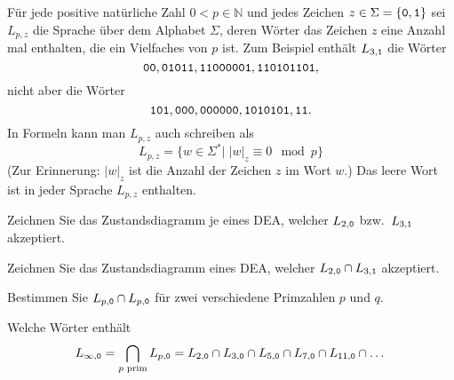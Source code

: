 Für jede positive natürliche Zahl $0<p\in\mathbb N$ und jedes Zeichen
$z\in \Sigma=\{\text{\tt 0},\text{\tt 1}\}$
sei $L_{p,z}$ die Sprache über dem Alphabet
$\Sigma$, deren Wörter das Zeichen $z$ eine Anzahl mal
enthalten, die ein Vielfaches von $p$ ist. Zum Beispiel enthält
$L_{3,\text{\tt 1}}$ die Wörter
\[
\text{\tt 00},
\text{\tt 01011},
\text{\tt 11000001},
\text{\tt 110101101},
\]
nicht aber die Wörter
\[
\text{\tt 101},
\text{\tt 000},
\text{\tt 000000},
\text{\tt 1010101},
\text{\tt 11}.
\]
In Formeln kann man $L_{p,z}$ auch schreiben als
\[
L_{p,z}=\{w\in\Sigma^*|\; |w|_z\equiv 0\mod p\}
\]
(Zur Erinnerung: $|w|_z$ ist die Anzahl der Zeichen $z$ im Wort $w$.)
Das leere Wort ist in jeder Sprache $L_{p,z}$ enthalten.
\begin{teilaufgaben}
\item Zeichnen Sie das Zustandsdiagramm je eines DEA, welcher
$L_{2,\text{\tt 0}}$ bzw.~$L_{3,\text{\tt 1}}$ akzeptiert.
\item Zeichnen Sie das Zustandsdiagramm eines DEA, welcher
$L_{2,\text{\tt 0}}\cap L_{3,\text{\tt 1}}$ akzeptiert.
\item
Bestimmen Sie
$L_{p,\text{\tt 0}} \cap L_{p,\text{\tt 0}}$
für zwei verschiedene Primzahlen $p$ und $q$.
\item Welche Wörter enthält
\[
L_{\infty,\text{\tt 0}}
=
\bigcap_{\text{$p$ prim}}L_{p,\text{\tt 0}}
=
L_{2,\text{\tt 0}}\cap
L_{3,\text{\tt 0}}\cap
L_{5,\text{\tt 0}}\cap
L_{7,\text{\tt 0}}\cap
L_{11,\text{\tt 0}}\cap\dots
\]
\end{teilaufgaben}


